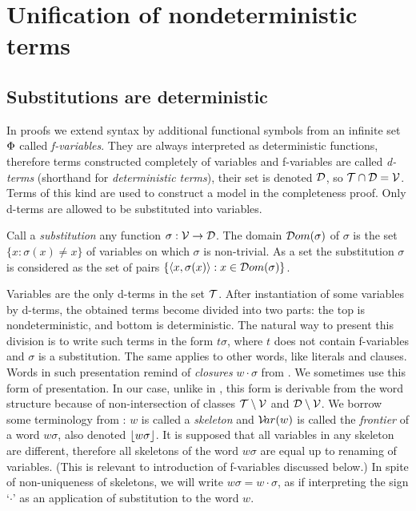 \section{Unification of nondeterministic terms}

\subsection{Substitutions are deterministic}

In proofs we extend syntax by additional functional symbols from an infinite
set \(\Phi\) called {\em f-variables}.  They are always interpreted as
deterministic functions, therefore terms constructed completely of variables
and f-variables are called {\em d-terms} (shorthand for {\em deterministic
terms}), their set is denoted ${\cal D}$, so \({\cal T} \cap {\cal D} ={\cal V}\).
Terms of this kind are used to construct a model in the completeness proof.
Only d-terms are allowed to be substituted into variables. \vspace{.5ex}

\begin{DEFINITION}\label{def:substitution}
Call a {\em substitution} any function \(\sigma:{\cal V} \to {\cal D}\).  The
domain \({\sl{\cal D}om} (\sigma)\) of $\sigma$ is the set \(\{x: \sigma(x) \neq x\}\)
of variables on which $\sigma$ is non-trivial.  As a set the substitution
$\sigma$ is considered as the set of pairs \(\{\langle x,\sigma(x)\rangle: x\in{\sl{\cal D}om}
(\sigma)\}\).
\end{DEFINITION} \vspace{.5ex}

Variables are the only d-terms in the set ${\cal T}$.  After instantiation of
some variables by d-terms, the obtained terms become divided into two parts:
the top is nondeterministic, and bottom is deterministic.  The natural way to
present this division is to write such terms in the form \(t\sigma\), where
$t$ does not contain f-variables and $\sigma$ is a substitution.  The same
applies to other words, like literals and clauses.  Words in such
presentation remind of {\em closures} \(w\cdot \sigma\) from \cite
{Basic-par}.  We sometimes use this form of presentation.  In our case,
unlike in \cite {Basic-par}, this form is derivable from the word structure
because of non-intersection of classes \({\cal T} \setminus {\cal V}\) and
\({\cal D} \setminus {\cal V}\).  We borrow some terminology from \cite
{Basic-par}: $w$ is called a {\em skeleton} and \({\sl{\cal V}\!ar}(w)\) is called the {\em
frontier} of a word \(w\sigma\), also denoted \(\lfloor w\sigma\rfloor\).  It is
supposed that all variables in any skeleton are different, therefore all
skeletons of the word \(w\sigma\) are equal up to renaming of variables.
(This is relevant to introduction of f-variables discussed below.)  In spite
of non-uniqueness of skeletons, we will write \(w\sigma=w\cdot \sigma\), as
if interpreting the sign `$\cdot $' as an application of substitution to the
word $w$.

